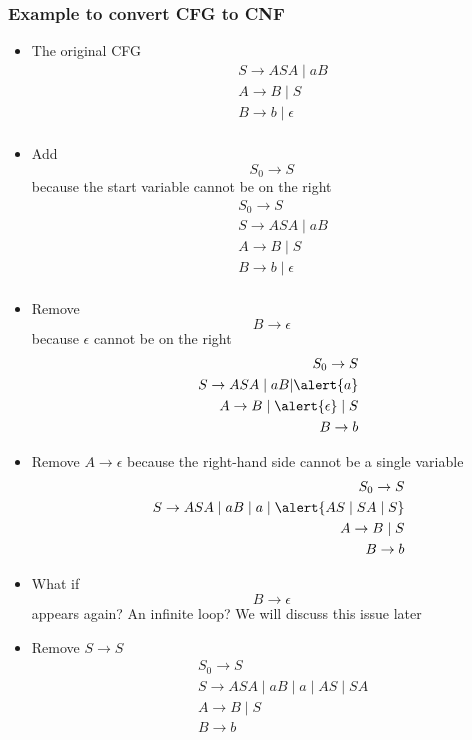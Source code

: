 \begin{frame}[allowframebreaks] \frametitle{Example to convert CFG to CNF}
  \begin{itemize}
\item The original CFG
  \begin{eqnarray*}
&& S \rightarrow ASA\mid aB\\
&& A \rightarrow B\mid S\\
&& B \rightarrow b \mid \epsilon\\
\end{eqnarray*}
\item Add
  \begin{equation*}
S_0 \rightarrow S
\end{equation*}
because the start variable cannot be on the right
  \begin{eqnarray*}
&& S_0 \rightarrow S\\
&& S \rightarrow ASA\mid aB\\
&& A \rightarrow B\mid S\\
&& B \rightarrow b \mid \epsilon\\
\end{eqnarray*}
\item Remove
  \begin{equation*}
  B \rightarrow \epsilon 
\end{equation*}
because $\epsilon$ cannot be on the right
\begin{eqnarray*}
&& S_0 \rightarrow S\\
&& S \rightarrow ASA\mid aB|\alert{a}\\
&& A \rightarrow B\mid \alert{\epsilon} \mid S\\
&& B \rightarrow b\\
\end{eqnarray*}
\item Remove $A\rightarrow \epsilon$ because the right-hand side
  cannot be a single variable
\begin{eqnarray*}
&& S_0 \rightarrow S\\
&& S \rightarrow ASA\mid aB\mid a \mid \alert{AS\mid SA \mid S}\\
&& A \rightarrow B\mid S\\
&& B \rightarrow b
\end{eqnarray*}
\item What if
  \begin{equation*}
    B \rightarrow \epsilon
  \end{equation*}
appears again? An infinite loop? We will discuss this issue later
\item Remove $S\rightarrow S$
\begin{eqnarray*}
&& S_0 \rightarrow S\\
&& S \rightarrow ASA\mid aB\mid a \mid AS\mid SA\\
&& A \rightarrow B\mid S\\
&& B \rightarrow b
\end{eqnarray*}
 

\end{itemize}
\end{frame}
